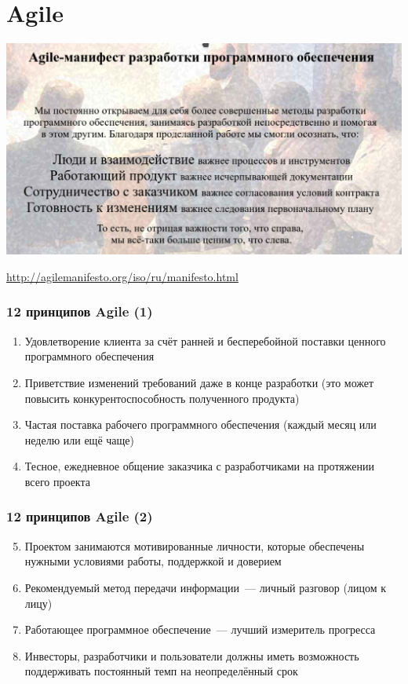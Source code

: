 \documentclass{../../slides-style}
\begin{document}
    \section{Agile}

    \begin{frame}
        \begin{center}
            \includegraphics[width=\textwidth]{agileManifesto.png}
        \end{center}
        \begin{small}
            \url{http://agilemanifesto.org/iso/ru/manifesto.html}
        \end{small}
    \end{frame}

    \begin{frame}
        \frametitle{12 принципов Agile (1)}
        \begin{enumerate}
            \item Удовлетворение клиента за счёт ранней и бесперебойной поставки ценного программного обеспечения
            \item Приветствие изменений требований даже в конце разработки (это может повысить конкурентоспособность полученного продукта)
            \item Частая поставка рабочего программного обеспечения (каждый месяц или неделю или ещё чаще)
            \item Тесное, ежедневное общение заказчика с разработчиками на протяжении всего проекта
        \end{enumerate}
    \end{frame}

    \begin{frame}
        \frametitle{12 принципов Agile (2)}
        \begin{enumerate}
            \setcounter{enumi}{4}
            \item Проектом занимаются мотивированные личности, которые обеспечены нужными условиями работы, поддержкой и доверием
            \item Рекомендуемый метод передачи информации~--- личный разговор (лицом к лицу)
            \item Работающее программное обеспечение~--- лучший измеритель прогресса
            \item Инвесторы, разработчики и пользователи должны иметь возможность поддерживать постоянный темп на неопределённый срок
        \end{enumerate}
    \end{frame}
\end{document}
